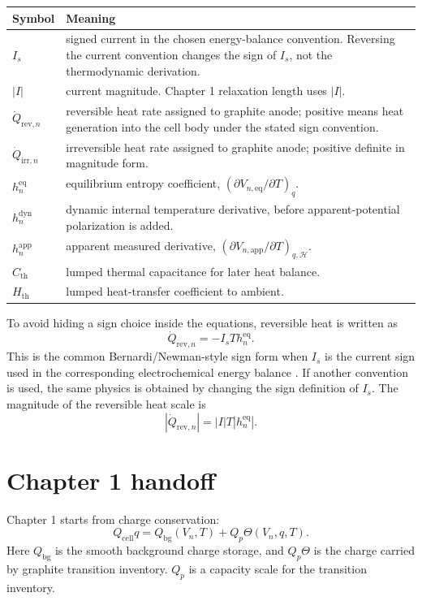 \documentclass[11pt,a4paper]{article}
\newcommand{\eqs}{\mathrm{eq}}
\newcommand{\dyn}{\mathrm{dyn}}
\newcommand{\app}{\mathrm{app}}
\newcommand{\rev}{\mathrm{rev}}
\newcommand{\irr}{\mathrm{irr}}
\newcommand{\bg}{\mathrm{bg}}
\newcommand{\cell}{\mathrm{cell}}
\newcommand{\thm}{\mathrm{th}}
\newcommand{\calH}{\mathcal H}
\begin{document}
\begin{longtable}{@{}p{}p{}@{}}
\toprule
Symbol & Meaning \\
\midrule
\endhead
\(I_s\) & signed current in the chosen energy-balance convention. Reversing the current convention changes the sign of \(I_s\), not the thermodynamic derivation. \\
\(|I|\) & current magnitude. Chapter 1 relaxation length uses \(|I|\). \\
\(\dot Q_{\rev,n}\) & reversible heat rate assigned to graphite anode; positive means heat generation into the cell body under the stated sign convention. \\
\(\dot Q_{\irr,n}\) & irreversible heat rate assigned to graphite anode; positive definite in magnitude form. \\
\(h_n^{\eqs}\) & equilibrium entropy coefficient, \((\partial V_{n,\eqs}/\partial T)_q\). \\
\(h_n^{\dyn}\) & dynamic internal temperature derivative, before apparent-potential polarization is added. \\
\(h_n^{\app}\) & apparent measured derivative, \((\partial V_{n,\app}/\partial T)_{q,\calH}\). \\
\(C_{\thm}\) & lumped thermal capacitance for later heat balance. \\
\(H_{\thm}\) & lumped heat-transfer coefficient to ambient. \\
\bottomrule
\end{longtable}

To avoid hiding a sign choice inside the equations, reversible heat is written as
\[
\dot Q_{\rev,n}=-I_sT h_n^{\eqs}.
\]
This is the common Bernardi/Newman-style sign form when \(I_s\) is the current sign used in the
corresponding electrochemical energy balance \cite{bernardi1985,newman2004}. If another convention is used,
the same physics is obtained by changing the sign definition of \(I_s\). The magnitude of the reversible heat
scale is
\[
|\dot Q_{\rev,n}|=|I|T|h_n^{\eqs}|.
\]

\section{Chapter 1 handoff}\label{sec:handoff}

Chapter 1 starts from charge conservation:
\begin{equation}
Q_{\cell}q
=
Q_{\bg}(V_n,T)+Q_p\Theta(V_n,q,T).
\label{eq:dynamic_charge_balance}
\end{equation}
Here \(Q_{\bg}\) is the smooth background charge storage, and \(Q_p\Theta\) is the charge carried by
graphite transition inventory. \(Q_p\) is a capacity scale for the transition inventory.
\end{document}
